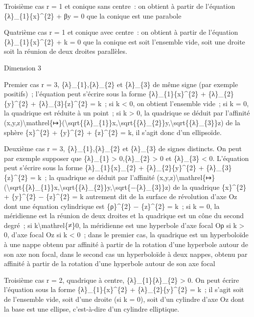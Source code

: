 \documentclass[]{article}
\begin{document}
Troisième cas r = 1 et conique sans centre~: on obtient à partir de
l'équation \{λ\}\_\{1\}\{x\}\^{}\{2\} + βy = 0 que la conique est une
parabole

Quatrième cas r = 1 et conique avec centre~: on obtient à partir de
l'équation \{λ\}\_\{1\}\{x\}\^{}\{2\} + k = 0 que la conique est soit
l'ensemble vide, soit une droite soit la réunion de deux droites
parallèles.

Dimension 3

Premier cas r = 3, \{λ\}\_\{1\},\{λ\}\_\{2\} et \{λ\}\_\{3\} de même
signe (par exemple positifs)~; l'équation peut s'écrire sous la forme
\{λ\}\_\{1\}\{x\}\^{}\{2\} + \{λ\}\_\{2\}\{y\}\^{}\{2\} +
\{λ\}\_\{3\}\{z\}\^{}\{2\} = k~; si k \textless{} 0, on obtient
l'ensemble vide~; si k = 0, la quadrique est réduite à un point~; si k
\textgreater{} 0, la quadrique se déduit par l'affinité
(x,y,z)\textbackslash{}mathrel\{↦\}(\textbackslash{}sqrt\{\{λ\}\_\{1\}\}x,\textbackslash{}sqrt\{\{λ\}\_\{2\}\}y,\textbackslash{}sqrt\{\{λ\}\_\{3\}\}z)
de la sphère \{x\}\^{}\{2\} + \{y\}\^{}\{2\} + \{z\}\^{}\{2\} = k, il
s'agit donc d'un ellipsoïde.

Deuxième cas r = 3, \{λ\}\_\{1\},\{λ\}\_\{2\} et \{λ\}\_\{3\} de signes
distincts. On peut par exemple supposer que \{λ\}\_\{1\} \textgreater{}
0,\{λ\}\_\{2\} \textgreater{} 0 et \{λ\}\_\{3\} \textless{} 0.
L'équation peut s'écrire sous la forme \{λ\}\_\{1\}\{x\}\_\{2\} +
\{λ\}\_\{2\}\{y\}\^{}\{2\} + \{λ\}\_\{3\}\{z\}\^{}\{2\} = k~; la
quadrique se déduit par l'affinité
(x,y,z)\textbackslash{}mathrel\{↦\}(\textbackslash{}sqrt\{\{λ\}\_\{1\}\}x,\textbackslash{}sqrt\{\{λ\}\_\{2\}\}y,\textbackslash{}sqrt\{−\{λ\}\_\{3\}\}z)
de la quadrique \{x\}\^{}\{2\} + \{y\}\^{}\{2\} − \{z\}\^{}\{2\} = k
autrement dit de la surface de révolution d'axe Oz dont une équation
cylindrique est \{ρ\}\^{}\{2\} − \{z\}\^{}\{2\} = k~; si k = 0, la
méridienne est la réunion de deux droites et la quadrique est un cône du
second degré~; si k\textbackslash{}mathrel\{≠\}0, la méridienne est une
hyperbole d'axe focal Oρ si k \textgreater{} 0, d'axe focal Oz si k
\textless{} 0~; dans le premier cas, la quadrique est un hyperboloïde à
une nappe obtenu par affinité à partir de la rotation d'une hyperbole
autour de son axe non focal, dans le second cas un hyperboloïde à deux
nappes, obtenu par affinité à partir de la rotation d'une hyperbole
autour de son axe focal

Troisième cas r = 2, quadrique à centre, \{λ\}\_\{1\}\{λ\}\_\{2\}
\textgreater{} 0. On peut écrire l'équation sous la forme
\{λ\}\_\{1\}\{x\}\^{}\{2\} + \{λ\}\_\{2\}\{y\}\^{}\{2\} = k~; il s'agit
soit de l'ensemble vide, soit d'une droite (si k = 0), soit d'un
cylindre d'axe Oz dont la base est une ellipse, c'est-à-dire d'un
cylindre elliptique.
\end{document}

